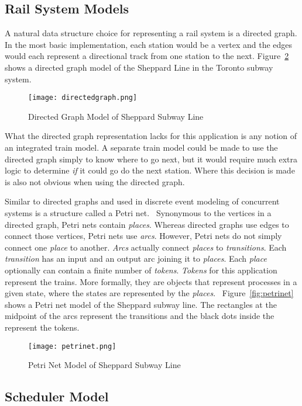 \subsection{Rail System Models}
A natural data structure choice for representing a rail system is a directed graph.  In the most basic implementation, each station would be a vertex and the edges would each represent a directional track from one station to the next. Figure~\ref{fig:directedgraph} shows a directed graph model of the Sheppard Line in the Toronto subway system.
\begin{figure}[htb]
	\centering
	\texttt{[image: directedgraph.png]}
	\caption{Directed Graph Model of Sheppard Subway Line}
	\label{fig:directedgraph}
\end{figure}
What the directed graph representation lacks for this application is any notion of an integrated train model. A separate train model could be made to use the directed graph simply to know where to go next, but it would require much extra logic to determine \textit{if} it could go do the next station.  Where this decision is made is also not obvious when using the directed graph.

Similar to directed graphs and used in discrete event modeling of concurrent systems is a structure called a Petri net.~\cite{Petri62}  Synonymous to the vertices in a directed graph, Petri nets contain \textit{places}.  Whereas directed graphs use edges to connect those vertices, Petri nets use \textit{arcs}. However, Petri nets do not simply connect one \textit{place} to another.  \textit{Arcs} actually connect \textit{places} to \textit{transitions}. Each \textit{transition} has an input and an output arc joining it to \textit{places}.  Each \textit{place} optionally can contain a finite number of \textit{tokens}.  \textit{Tokens} for this application represent the trains.  More formally, they are objects that represent processes in a given state, where the states are represented by the \textit{places}.~\cite{Kristoffersen2003}  Figure~\ref{fig:petrinet} shows a Petri net model of the Sheppard subway line. The rectangles at the midpoint of the arcs represent the transitions and the black dots inside the represent the tokens.
\begin{figure}[htb]
	\centering
	\texttt{[image: petrinet.png]}
	\caption{Petri Net Model of Sheppard Subway Line}
	\label{fig:directedgraph}
\end{figure}

\subsection{Scheduler Model}


